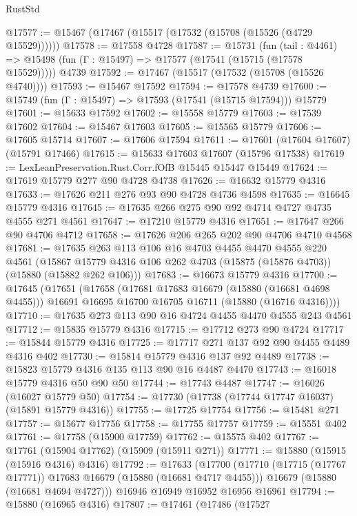 \begin{lexlean}{RustStd}
\begin{coremodule}
@17577 := @15467 (@17467 (@15517 (@17532 (@15708 (@15526 (@4729 @15529))))))
@17578 := @17558 @4728
@17587 := @15731
    (fun (tail : @4461) => @15498 (fun (Γ : @15497) => @17577 (@17541 (@15715 (@17578 @15529)))))
    @4739
@17592 := @17467 (@15517 (@17532 (@15708 (@15526 @4740))))
@17593 := @15467 @17592
@17594 := @17578 @4739
@17600 := @15749 (fun (Γ : @15497) => @17593 (@17541 (@15715 @17594))) @15779
@17601 := @15633 @17592
@17602 := @15558 @15779
@17603 := @17539 @17602
@17604 := @15467 @17603
@17605 := @15565 @15779
@17606 := @17605 @15714
@17607 := @17606 @17594
@17611 := @17601 (@17604 @17607) (@15791 @17466)
@17615 := @15633 @17603 @17607 (@15796 @17538)
@17619 := LexLeanPreservation.Rust.Corr.fOfB @15445 @15447 @15449
@17624 := @17619 @15779 @277 @90 @4728 @4738
@17626 := @16632 @15779 @4316
@17633 := @17626 @211 @276 @93 @90 @4728 @4736 @4598
@17635 := @16645 @15779 @4316
@17645 := @17635 @266 @275 @90 @92 @4714 @4727 @4735 @4555 @271 @4561
@17647 := @17210 @15779 @4316
@17651 := @17647 @266 @90 @4706 @4712
@17658 := @17626 @206 @265 @202 @90 @4706 @4710 @4568
@17681 := @17635
    @263
    @113
    @106
    @16
    @4703
    @4455
    @4470
    @4555
    @220
    @4561
    (@15867 @15779 @4316 @106 @262 @4703 (@15875 (@15876 @4703)) (@15880 (@15882 @262 @106)))
@17683 := @16673 @15779 @4316
@17700 := @17645
    (@17651
      (@17658
        (@17681 @17683 @16679 (@15880 (@16681 @4698 @4455)))
        @16691
        @16695
        @16700
        @16705
        @16711
        (@15880 (@16716 @4316))))
@17710 := @17635 @273 @113 @90 @16 @4724 @4455 @4470 @4555 @243 @4561
@17712 := @15835 @15779 @4316
@17715 := @17712 @273 @90 @4724
@17717 := @15844 @15779 @4316
@17725 := @17717 @271 @137 @92 @90 @4455 @4489 @4316 @402
@17730 := @15814 @15779 @4316 @137 @92 @4489
@17738 := @15823 @15779 @4316 @135 @113 @90 @16 @4487 @4470
@17743 := @16018 @15779 @4316 @50 @90 @50
@17744 := @17743 @4487
@17747 := @16026 (@16027 @15779 @50)
@17754 := @17730 (@17738 (@17744 @17747 @16037) (@15891 @15779 @4316))
@17755 := @17725 @17754
@17756 := @15481 @271
@17757 := @15677 @17756
@17758 := @17755 @17757
@17759 := @15551 @402
@17761 := @17758 (@15900 @17759)
@17762 := @15575 @402
@17767 := @17761 (@15904 @17762) (@15909 (@15911 @271))
@17771 := @15880 (@15915 (@15916 @4316) @4316)
@17792 := @17633
    (@17700
      (@17710 (@17715 (@17767 @17771)) @17683 @16679 (@15880 (@16681 @4717 @4455)))
      @16679
      (@15880 (@16681 @4694 @4727)))
    @16946
    @16949
    @16952
    @16956
    @16961
@17794 := @15880 (@16965 @4316)
@17807 := @17461
    (@17486
      (@17527

\end{coremodule}
\end{lexlean}
